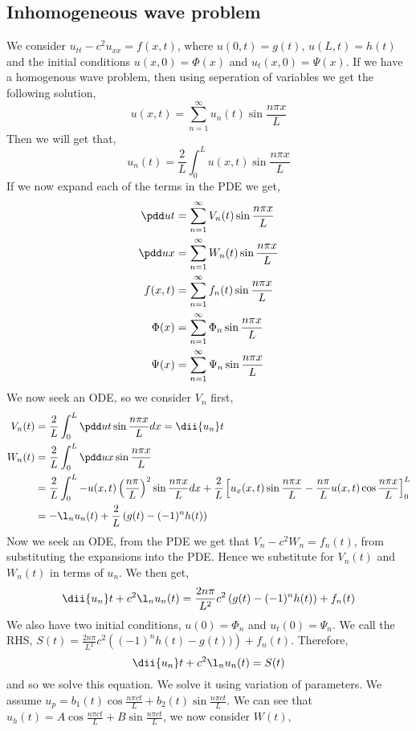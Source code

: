 \subsection{Inhomogeneous wave problem}
We consider $u_{tt} - c^2u_{xx} = f(x, t)$, where $u(0, t) = g(t)$, $u(L, t) = h(t)$ and the initial conditions $u(x, 0) = \Phi(x)$ and $u_t(x, 0) = \Psi(x)$. If we have a homogenous wave problem, then using seperation of variables we get the following solution,
$$ u(x, t) = \sum_{n=1}^{\infty} u_n(t) \sin \frac{n\pi x}{L} $$
Then we will get that,
$$ u_n(t) = \frac{2}{L}\int_0^L u(x, t)\sin \frac{n\pi x}{L} $$
If we now expand each of the terms in the PDE we get,
\begin{align*}
  \pdd u t &= \sum_{n=1}^\infty V_n(t)\sin \frac{n\pi x}{L}\\
  \pdd u x &= \sum_{n=1}^\infty W_n(t)\sin \frac{n\pi x}{L}\\
  f(x, t) &= \sum_{n=1}^\infty f_n(t)\sin \frac{n\pi x}{L}\\
  \Phi (x) &= \sum_{n=1}^\infty \Phi_n\sin \frac{n\pi x}{L}\\
  \Psi (x) &= \sum_{n=1}^\infty \Psi_n\sin \frac{n\pi x}{L}
\end{align*}
We now seek an ODE, so we consider $V_n$ first,
\begin{align*}
  V_n (t) &= \frac{2}{L}\int_0^L \pdd u t \sin \frac{n\pi x}{L} dx = \dii {u_n} t\\
  W_n (t) &= \frac{2}{L}\int_0^L \pdd u x \sin \frac{n\pi x }{L}\\
  &= \frac{2}{L}\int_0^L -u(x, t)\left( \frac{n\pi}{L} \right)^2 \sin \frac{n\pi x}{L}dx + \frac{2}{L}\left[ u_x(x, t)\sin \frac{n\pi x}{L} - \frac{n\pi}{L}u(x, t)\cos \frac{n\pi x}{L} \right]_0^L\\
  &= -\l_nu_n(t) + \frac{2}{L}\left( g(t) - (-1)^n h(t) \right)
\end{align*}
Now we seek an ODE, from the PDE we get that $V_n - c^2W_n = f_n(t)$, from substituting the expansions into the PDE. Hence we substitute for $V_n(t)$ and $W_n(t)$ in terms of $u_n$. We then get,
$$ \dii {u_n} t + c^2\l_n u_n(t) = \frac{2n\pi}{L^2}c^2 \left( g(t) - (-1)^n h(t)\right) + f_n(t) $$
We also have two initial conditions, $u(0) = \Phi_n$ and $u_t(0) = \Psi_n$. We call the RHS, $S(t) = \frac{2n\pi}{L^2}c^2 \left( (-1)^n h(t) - g(t)) \right) + f_n(t)$. Therefore,
$$ \dii {u_n} t + c^2\l_n u_n (t) = S(t) $$
and so we solve this equation. We solve it using variation of parameters. We assume $u_p = b_1(t)\cos \frac{n\pi ct}{L} + b_2(t)\sin \frac{n\pi ct}{L}$. We can see that $u_h(t) = A\cos \frac{n\pi c t}{L} + B\sin \frac{n\pi c t}{L}$, we now consider $W(t)$,
